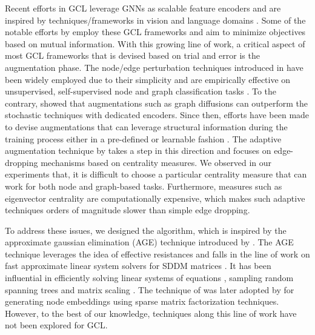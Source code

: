 \documentclass{article}
\theoremstyle{plain}
\theoremstyle{definition}
\theoremstyle{remark}
\begin{document}
Recent efforts in GCL leverage GNNs as scalable feature encoders and are inspired by techniques/frameworks in vision \citep{gidaris2018unsupervised, hjelm2018learning, chen2020simple, jing2020self} and language domains \citep{mikolov2013efficient, devlin2018bert, radford2018improving, lan2019albert}. Some of the notable efforts by \citet{velickovic2019deep, sun2019infograph, zhu2020deep, you2020graph, hassani2020contrastive} employ these GCL frameworks and aim to minimize objectives based on mutual information. With this growing line of work, a critical aspect of most GCL frameworks that is devised based on trial and error is the augmentation phase. The node/edge perturbation techniques introduced in \citet{you2020graph} have been widely employed due to their simplicity and are empirically effective on unsupervised, self-supervised node and graph classification tasks \citep{zhu2021empirical, thakoor2021bootstrapped}. To the contrary, \citet{hassani2020contrastive} showed that augmentations such as graph diffusions can outperform the stochastic techniques with dedicated encoders. Since then, efforts have been made to devise augmentations that can leverage structural information during the training process either in a pre-defined \citep{zhu2021graph} or learnable fashion \citep{yin2022autogcl}. The adaptive augmentation technique by \citet{zhu2021graph} takes a step in this direction and focuses on edge-dropping mechanisms based on centrality measures. We observed in our experiments that, it is difficult to choose a particular centrality measure that can work for both node and graph-based tasks. Furthermore, measures such as eigenvector centrality are computationally expensive, which makes such adaptive techniques orders of magnitude slower than simple edge dropping. 

To address these issues, we designed the  algorithm, which is inspired by the approximate gaussian elimination (AGE) technique introduced by \citet{kyng2016approximate}. The AGE technique leverages the idea of effective resistances \citep{spielman2008graph} and falls in the line of work on fast approximate linear system solvers for SDDM matrices \citep{spielman2003solving, spielman2004nearly, koutis2011nearly, cohen2014solving, kyng2016sparsified}. It has been influential in efficiently solving linear systems of equations \citep{cohen2018solving, peng2021solving, cohen2021solving, chen2021rchol}, sampling random spanning trees \citep{durfee2017sampling} and matrix scaling \citep{cohen2017matrix}. The technique of \citet{kyng2016approximate} was later adopted by \citet{fahrbach2020faster} for generating node embeddings using sparse matrix factorization techniques. However, to the best of our knowledge, techniques along this line of work have not been explored for GCL.
\end{document}

